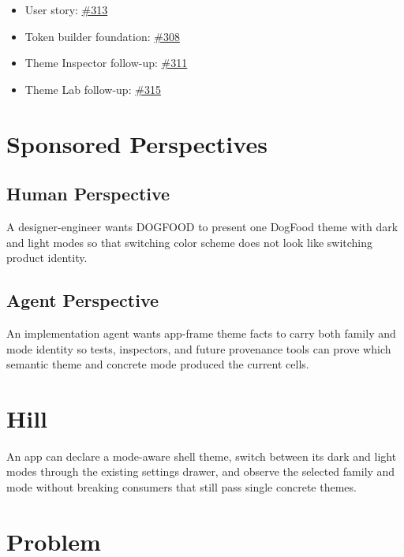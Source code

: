 \begin{itemize}
\tightlist
\item
  User story: \href{https://github.com/flyingrobots/bijou/issues/313}{\#313}
\item
  Token builder foundation: \href{https://github.com/flyingrobots/bijou/issues/308}{\#308}
\item
  Theme Inspector follow-up: \href{https://github.com/flyingrobots/bijou/issues/311}{\#311}
\item
  Theme Lab follow-up: \href{https://github.com/flyingrobots/bijou/issues/315}{\#315}
\end{itemize}

\section{Sponsored Perspectives}\label{record-181-sponsored-perspectives}

\subsection{Human Perspective}\label{record-181-human-perspective}

A designer-engineer wants DOGFOOD to present one DogFood theme with dark and light modes so that switching color scheme does not look like switching product identity.

\subsection{Agent Perspective}\label{record-181-agent-perspective}

An implementation agent wants app-frame theme facts to carry both family and mode identity so tests, inspectors, and future provenance tools can prove which semantic theme and concrete mode produced the current cells.

\section{Hill}\label{record-181-hill}

An app can declare a mode-aware shell theme, switch between its dark and light modes through the existing settings drawer, and observe the selected family and mode without breaking consumers that still pass single concrete themes.

\section{Problem}\label{record-181-problem}

